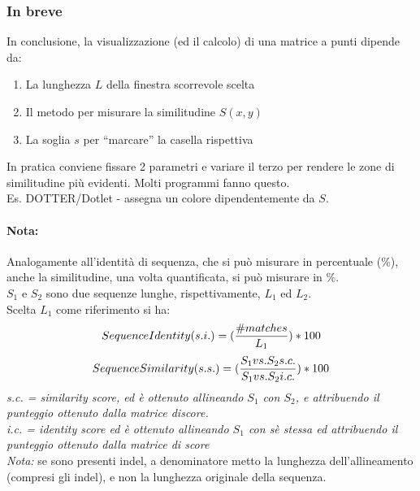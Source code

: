 \documentclass{article}
\begin{document}
\subsubsection{In breve}
In conclusione, la visualizzazione (ed il calcolo) di una
matrice a punti dipende da:
\begin{enumerate}
    \item La lunghezza $L$ della finestra scorrevole scelta
    \item Il metodo per misurare la similitudine $S(x,y)$
    \item La soglia $s$ per “marcare” la casella rispettiva
\end{enumerate}
In pratica conviene fissare 2 parametri e variare il terzo per rendere le zone di
similitudine più evidenti. Molti programmi fanno questo.\\
Es. DOTTER/Dotlet - assegna un colore dipendentemente da $S$.
\paragraph{Nota:}Analogamente all’identità di sequenza, che si può
misurare in percentuale (\%), anche la similitudine, una volta
quantificata, si può misurare in \%.\\
$S_1$ e $S_2$ sono due sequenze lunghe, rispettivamente, $L_1$ ed $L_2$.\\
Scelta $L_1$ come riferimento si ha:
$$ SequenceIdentity(s.i.) = ({\#matches \over L_1}) * 100 $$
$$ SequenceSimilarity(s.s.) = ({S_1 vs. S_2 s.c. \over S_1 vs. S_2 i.c.}) * 100 $$
\textit{s.c. = similarity score, ed è ottenuto allineando $S_1$ con $S_2$, e attribuendo il punteggio ottenuto dalla matrice discore.\\i.c. = identity score ed è ottenuto allineando $S_1$ con sè stessa ed attribuendo il punteggio ottenuto dalla matrice di score}
\textit{\\Nota:} se sono presenti indel, a denominatore metto la lunghezza
dell’allineamento (compresi gli indel), e non la lunghezza originale della sequenza.
\end{document}
